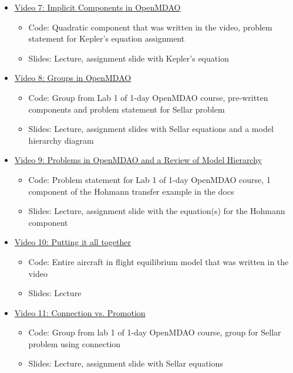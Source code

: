 \documentclass[12pt, letterpaper]{article}
\begin{document}
\begin{itemize}
	\item \underline{Video 7: Implicit Components in OpenMDAO} 
		\begin{itemize}
			\item Code: Quadratic component that was written in the video, problem statement for Kepler's equation assignment
			\item Slides: Lecture, assignment slide with Kepler's equation
		\end{itemize}

	\item \underline{Video 8: Groups in OpenMDAO} 
		\begin{itemize}
			\item Code: Group from Lab 1 of 1-day OpenMDAO course, pre-written components and problem statement for Sellar problem
			\item Slides: Lecture, assignment slides with Sellar equations and a model hierarchy diagram
		\end{itemize}
		
	\item \underline{Video 9: Problems in OpenMDAO and a Review of Model Hierarchy} 
		\begin{itemize}
			\item Code: Problem statement for Lab 1 of 1-day OpenMDAO course, 1 component of the Hohmann transfer example in the docs
			\item Slides: Lecture, assignment slide with the equation(s) for the Hohmann component
		\end{itemize}

	\item \underline{Video 10: Putting it all together} 
		\begin{itemize}
			\item Code: Entire aircraft in flight equilibrium model that was written in the video
			\item Slides: Lecture
		\end{itemize}
		
	\item \underline{Video 11: Connection vs. Promotion} 
		\begin{itemize}
			\item Code: Group from lab 1 of 1-day OpenMDAO course, group for Sellar problem using connection
			\item Slides: Lecture, assignment slide with Sellar equations
		\end{itemize}
		

\end{itemize}
\end{document}

